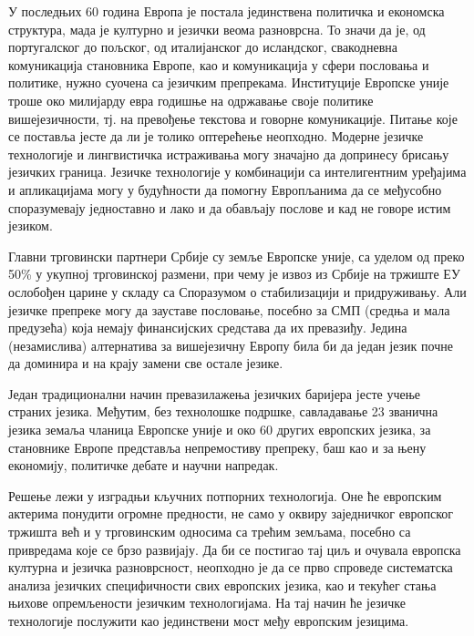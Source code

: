 \begin{multicols}{2}


У последњих 60 година Европа је постала јединствена политичка и економска структура, мада је културно и језички веома разноврсна. То значи да је, од португалског до пољског, од италијанског до исландског, свакодневна комуникација становника Европе, као и комуникација у сфери пословања и политике, нужно суочена са језичким препрекама. Институције Европске уније троше око милијарду евра годишње на одржавање своје политике вишејезичности, тј. на превођење текстова и говорне комуникације. Питање које се поставља јесте да ли је толико оптерећење неопходно. Модерне језичке технологије и лингвистичка истраживања могу значајно да допринесу брисању језичких граница. Језичке технологије у комбинацији са интелигентним уређајима и апликацијама могу у будућности да помогну Европљанима да се међусобно споразумевају једноставно и лако и да обављају  послове и кад не говоре истим  језиком. 


Главни трговински партнери Србије су земље Европске уније, са уделом од преко 50\% у укупној трговинској размени, при чему је извоз из Србије на тржиште ЕУ ослобођен царине у складу са Споразумом о стабилизацији и придруживању. Али језичке препреке могу да зауставе пословање, посебно за СМП (средња и мала предузећа) која немају финансијских средстава да их превазиђу. Једина (незамислива) алтернатива за вишејезичну Европу била би да један језик почне да доминира и на крају замени све остале језике. 

Један традиционални начин превазилажења језичких баријера јесте учење страних језика. Међутим, без технолошке подршке, савладавање 23 званична језика земаља чланица Европске уније и око 60 других европских језика, за становнике Европе представља непремостиву препреку, баш као и за њену економију, политичке дебате и научни напредак. 

Решење лежи у изградњи кључних потпорних технологија. Оне ће европским актерима понудити огромне предности, не само у оквиру заједничког европског тржишта већ и у трговинским односима са трећим земљама, посебно са привредама које се брзо развијају. Да би се постигао тај циљ и очувала европска културна и језичка разноврсност, неопходно је да се прво спроведе систематска анализа језичких специфичности свих европских језика, као и  текућег стања њихове опремљености језичким технологијама. На тај начин ће језичке технологије послужити као јединствени мост међу европским језицима. 


\end{multicols}
